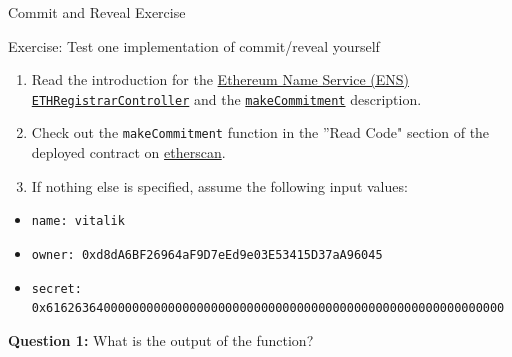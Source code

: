 \documentclass[]{beamer}
\begin{document}
\begin{frame}{Commit and Reveal Exercise}
	
	\begin{exercise}{Exercise: Test one implementation of commit/reveal yourself}
		\begin{enumerate}
			\item Read the introduction for the \href{https://docs.ens.domains/contract-api-reference/.eth-permanent-registrar/controller}{\link Ethereum Name Service (ENS) \texttt{ETHRegistrarController}} and the \href{https://docs.ens.domains/contract-api-reference/.eth-permanent-registrar/controller\#calculate-commitment-hash}{\link \texttt{makeCommitment}} description.
			\item Check out the \texttt{makeCommitment} function in the ''Read Code" section of the deployed contract on \href{https://etherscan.io/address/0x283af0b28c62c092c9727f1ee09c02ca627eb7f5\#readContract}{\link etherscan}.
			\item If nothing else is specified, assume the following input values:
		\end{enumerate}
					
		\begin{itemize}
			\item \texttt{name: vitalik}
			\item \texttt{owner: 0xd8dA6BF26964aF9D7eEd9e03E53415D37aA96045}
			\item \texttt{secret: 0x6162636400000000000000000000000000000000000000000000000000000000}
		\end{itemize}
			
		\textbf{Question 1:} What is the output of the function?
		
	\end{exercise}	
\end{frame}
\end{document}
